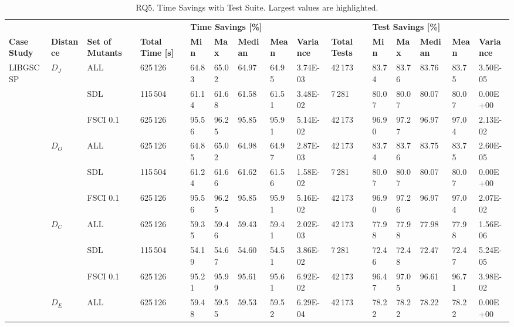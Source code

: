 
\begin{table*}[h]
\caption{RQ5. Time Savings with \APPR Test Suite. Largest values are highlighted.}
\label{table:results:reduction:prioritize} 
\tiny
\centering
\begin{tabular}{|lllllllllllllll|}
\hline
\textbf{}  &    &   &  & \multicolumn{5}{l}{\textbf{Time Savings [\%]}}    &    & \multicolumn{5}{l|}{\textbf{Test Savings [\%]}}  \\
\textbf{Case Study} & \textbf{Distance} & \textbf{Set of Mutants}& \textbf{Total Time [s]} & \textbf{Min} & \textbf{Max} & \textbf{Median} & \textbf{Mean} & \textbf{Variance} & \textbf{Total Tests} &\textbf{Min} & \textbf{Max} & \textbf{Median} & \textbf{Mean} & \textbf{Variance} \\
\hline
\multirow{12}{*}{LIBGSCSP} & \multirow{3}{*}{$D_J$}   & ALL  & 625\,126 & 64.83  & 65.02 & 64.97 & 64.95   & 3.74E-03  & 42\,173  & 83.74  & 83.76  & 83.76 & 83.75   & 3.50E-05    \\
 & & SDL & 115\,504 & 61.14  & 61.68  & 61.58 & 61.51   & 3.48E-02 & 7\,281   & 80.07  & 80.07  & 80.07 & 80.07   & 0.00E+00    \\
 & & FSCI 0.1   &  625\,126 & 95.56  & 96.25  & 95.85 & 95.91   & 5.14E-02  & 42\,173  & 96.90  & 97.27  & 96.97 & 97.04   & 2.13E-02    \\
 & \multirow{3}{*}{$D_O$}    & ALL & 625\,126 & 64.85  & 65.02  & 64.98 & 64.97   & 2.87E-03  & 42\,173  & 83.74  & 83.76  & 83.75 & 83.75   & 2.60E-05    \\
 & & SDL  & 115\,504& 61.24  & 61.66  & 61.62 & 61.56   & 1.58E-02  & 7\,281  & 80.07  & 80.07  & 80.07 & 80.07   & 0.00E+00    \\
 & & FSCI 0.1    & 625\,126 & 95.56  & 96.25  & 95.85 & 95.91   & 5.16E-02  & 42\,173  & 96.90  & 97.26  & 96.97 & 97.04   & 2.07E-02    \\
 & \multirow{3}{*}{$D_C$}    & ALL  &625\,126 & 59.35  & 59.46  & 59.43 & 59.41   & 2.02E-03 & 42\,173   & 77.98  & 77.98  & 77.98 & 77.98   & 1.56E-06    \\
 & & SDL  &115\,504 & 54.19  & 54.67  & 54.60 & 54.51   & 3.86E-02  & 7\,281  & 72.46  & 72.48  & 72.47 & 72.47   & 5.24E-05    \\
 & & FSCI 0.1    & 625\,126 & 95.21  & 95.99  & 95.61 & 95.61   & 6.92E-02  & 42\,173  & 96.47  & 97.05  & 96.61 & 96.71   & 3.98E-02    \\
 & \multirow{3}{*}{$D_E$} & ALL  & 625\,126& 59.48  & 59.55  & 59.53 & 59.52   & 6.29E-04  & 42\,173  & 78.22  & 78.22  & 78.22 & 78.22   & 0.00E+00    \\

\end{tabular}
\end{table*}
